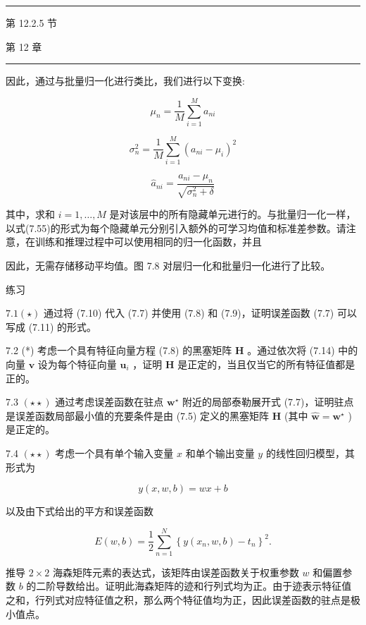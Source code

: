 \documentclass[10pt]{article}
\newcommand{\HRule}{\begin{center}\rule{0.9\linewidth}{0.2mm}\end{center}}
\begin{document}
\HRule

第 12.2.5 节

第 12 章

\HRule

因此，通过与批量归一化进行类比，我们进行以下变换:

\[
{\mu }_{n} = \frac{1}{M}\mathop{\sum }\limits_{{i = 1}}^{M}{a}_{ni} \tag{7.58}
\]

\[
{\sigma }_{n}^{2} = \frac{1}{M}\mathop{\sum }\limits_{{i = 1}}^{M}{\left( {a}_{ni} - {\mu }_{i}\right) }^{2} \tag{7.59}
\]

\[
{\widehat{a}}_{ni} = \frac{{a}_{ni} - {\mu }_{n}}{\sqrt{{\sigma }_{n}^{2} + \delta }} \tag{7.60}
\]

其中，求和 \(i = 1,\ldots ,M\) 是对该层中的所有隐藏单元进行的。与批量归一化一样，以式(7.55)的形式为每个隐藏单元分别引入额外的可学习均值和标准差参数。请注意，在训练和推理过程中可以使用相同的归一化函数，并且

因此，无需存储移动平均值。图 7.8 对层归一化和批量归一化进行了比较。

练习

\({7.1}\left( \star \right)\) 通过将 (7.10) 代入 (7.7) 并使用 (7.8) 和 (7.9)，证明误差函数 (7.7) 可以写成 (7.11) 的形式。

7.2 (*) 考虑一个具有特征向量方程 (7.8) 的黑塞矩阵 \(\mathbf{H}\) 。通过依次将 (7.14) 中的向量 \(\mathbf{v}\) 设为每个特征向量 \({\mathbf{u}}_{i}\) ，证明 \(\mathbf{H}\) 是正定的，当且仅当它的所有特征值都是正的。

7.3 \(\left( {\star  \star  }\right)\) 通过考虑误差函数在驻点 \({\mathbf{w}}^{ \star  }\) 附近的局部泰勒展开式 (7.7)，证明驻点是误差函数局部最小值的充要条件是由 (7.5) 定义的黑塞矩阵 \(\mathbf{H}\) (其中 \(\widehat{\mathbf{w}} = {\mathbf{w}}^{ \star  }\) )是正定的。

7.4 \(\left( {\star  \star  }\right)\) 考虑一个具有单个输入变量 \(x\) 和单个输出变量 \(y\) 的线性回归模型，其形式为

\[
y\left( {x,w,b}\right)  = {wx} + b \tag{7.61}
\]

以及由下式给出的平方和误差函数

\[
E\left( {w,b}\right)  = \frac{1}{2}\mathop{\sum }\limits_{{n = 1}}^{N}{\left\{  y\left( {x}_{n},w,b\right)  - {t}_{n}\right\}  }^{2}. \tag{7.62}
\]

推导 \(2 \times  2\) 海森矩阵元素的表达式，该矩阵由误差函数关于权重参数 \(w\) 和偏置参数 \(b\) 的二阶导数给出。证明此海森矩阵的迹和行列式均为正。由于迹表示特征值之和，行列式对应特征值之积，那么两个特征值均为正，因此误差函数的驻点是极小值点。
\end{document}
